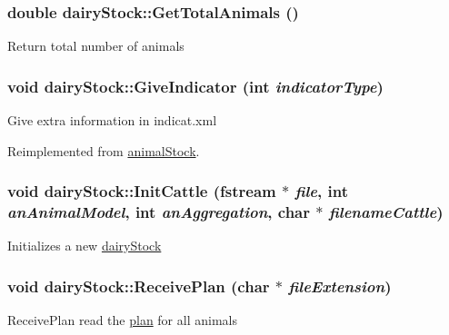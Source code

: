\label{classdairy_stock_af2ccb2b39af72516a6b917c13db1e7cd}
\hypertarget{classdairy_stock_a8db1921052fd00477cf26d15a965cda3}{
\subsubsection[{GetTotalAnimals}]{\setlength{\rightskip}{0pt plus 5cm}double dairyStock::GetTotalAnimals ()}}
\label{classdairy_stock_a8db1921052fd00477cf26d15a965cda3}
Return total number of animals \hypertarget{classdairy_stock_a3d06c27cd2651c99b1fdf1273d0f6289}{
\subsubsection[{GiveIndicator}]{\setlength{\rightskip}{0pt plus 5cm}void dairyStock::GiveIndicator (int {\em indicatorType})}}
\label{classdairy_stock_a3d06c27cd2651c99b1fdf1273d0f6289}
Give extra information in indicat.xml 

Reimplemented from \hyperlink{classanimal_stock_a7d6f9b68a88f2e5399f8dcdb3965a4f6}{animalStock}.\hypertarget{classdairy_stock_a12912676a0472206a16c98bbba037887}{
\subsubsection[{InitCattle}]{\setlength{\rightskip}{0pt plus 5cm}void dairyStock::InitCattle (fstream $\ast$ {\em file}, \/  int {\em anAnimalModel}, \/  int {\em anAggregation}, \/  char $\ast$ {\em filenameCattle})}}
\label{classdairy_stock_a12912676a0472206a16c98bbba037887}
Initializes a new \hyperlink{classdairy_stock}{dairyStock} \hypertarget{classdairy_stock_aa06e97a86fe280ee6b23ea2985317b65}{
\subsubsection[{ReceivePlan}]{\setlength{\rightskip}{0pt plus 5cm}void dairyStock::ReceivePlan (char $\ast$ {\em fileExtension})}}
\label{classdairy_stock_aa06e97a86fe280ee6b23ea2985317b65}
ReceivePlan read the \hyperlink{classplan}{plan} for all animals 

